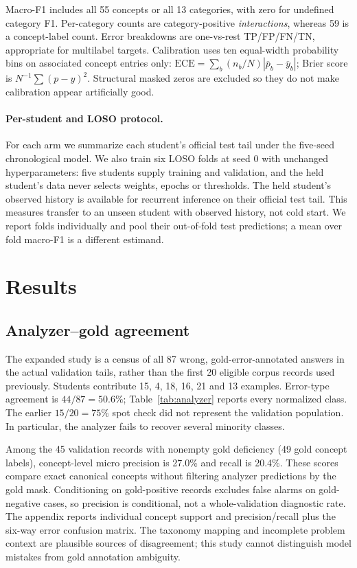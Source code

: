 \documentclass[11pt]{article}
\begin{document}
Macro-F1 includes all 55 concepts or all 13 categories, with zero for undefined category F1. Per-category counts are category-positive \emph{interactions}, whereas 59 is a concept-label count. Error breakdowns are one-vs-rest TP/FP/FN/TN, appropriate for multilabel targets. Calibration uses ten equal-width probability bins on associated concept entries only:
$\mathrm{ECE}=\sum_b(n_b/N)|\overline p_b-\overline y_b|$; Brier score is $N^{-1}\sum(p-y)^2$. Structural masked zeros are excluded so they do not make calibration appear artificially good.

\paragraph{Per-student and LOSO protocol.}
For each arm we summarize each student's official test tail under the five-seed chronological model. We also train six LOSO folds at seed 0 with unchanged hyperparameters: five students supply training and validation, and the held student's data never selects weights, epochs or thresholds. The held student's observed history is available for recurrent inference on their official test tail. This measures transfer to an unseen student with observed history, not cold start. We report folds individually and pool their out-of-fold test predictions; a mean over fold macro-F1 is a different estimand.

\section{Results}
\subsection{Analyzer--gold agreement}
The expanded study is a census of all 87 wrong, gold-error-annotated answers in the actual validation tails, rather than the first 20 eligible corpus records used previously. Students contribute 15, 4, 18, 16, 21 and 13 examples. Error-type agreement is $44/87=50.6\%$; Table~\ref{tab:analyzer} reports every normalized class. The earlier $15/20=75\%$ spot check did not represent the validation population. In particular, the analyzer fails to recover several minority classes.

Among the 45 validation records with nonempty gold deficiency (49 gold concept labels), concept-level micro precision is 27.0\% and recall is 20.4\%. These scores compare exact canonical concepts without filtering analyzer predictions by the gold mask. Conditioning on gold-positive records excludes false alarms on gold-negative cases, so precision is conditional, not a whole-validation diagnostic rate. The appendix reports individual concept support and precision/recall plus the six-way error confusion matrix. The taxonomy mapping and incomplete problem context are plausible sources of disagreement; this study cannot distinguish model mistakes from gold annotation ambiguity.
\end{document}
